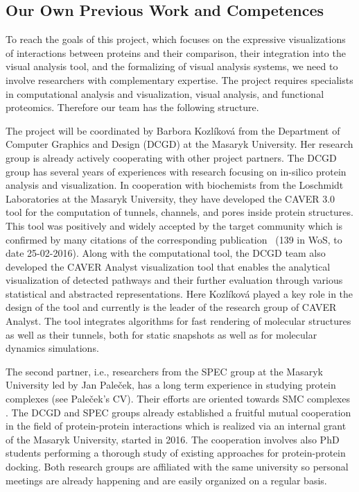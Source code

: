 \documentclass[11pt,a4paper,titlepage,oneside,onecolumn]{article}
\begin{document}
\subsection{Our Own Previous Work and Competences}
To reach the goals of this project, which focuses on the expressive visualizations of interactions between proteins and their comparison, their integration into the visual analysis tool, and the formalizing of visual analysis systems, we need to involve researchers with complementary expertise.
The project requires specialists in computational analysis and visualization, visual analysis, and functional proteomics.
Therefore our team has the following structure.

The project will be coordinated by Barbora Kozl\'{i}kov\'{a} from the Department of Computer Graphics and Design (DCGD) at the Masaryk University.
Her research group is already actively cooperating with other project partners. 
The DCGD group has several years of experiences with research focusing on in-silico protein analysis and visualization.
In cooperation with biochemists from the Loschmidt Laboratories at the Masaryk University, they have developed the CAVER 3.0~\cite{caver} tool for the computation of tunnels, channels, and pores inside protein structures. 
This tool was positively and widely accepted by the target community which is confirmed by many citations of the corresponding publication~\cite{caver} (139 in WoS, to date 25-02-2016).
Along with the computational tool, the DCGD team also developed the CAVER Analyst visualization tool \cite{analyst} that enables the analytical visualization of detected pathways and their further evaluation through various statistical and abstracted representations. 
Here Kozl\'{i}kov\'{a} played a key role in the design of the tool and currently is the leader of the research group of CAVER Analyst. 
The tool integrates algorithms for fast rendering of molecular structures as well as their tunnels, both for static snapshots as well as for molecular dynamics simulations. 

The second partner, i.e., researchers from the SPEC group at the Masaryk University led by Jan Pale\v{c}ek, has a long term experience in studying protein complexes (see Pale\v{c}ek's CV). 
Their efforts are oriented towards SMC complexes \cite{guerineau,hudson,Palecek2015}.
The DCGD and SPEC groups already established a fruitful mutual cooperation in the field of protein-protein interactions which is realized via an internal grant of the Masaryk University, started in 2016.
The cooperation involves also PhD students performing a thorough study of existing approaches for protein-protein docking.
Both research groups are affiliated with the same university so personal meetings are already happening and are easily organized on a regular basis.
 
\end{document}
